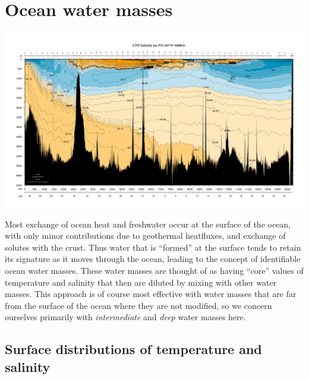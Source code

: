 
\chapter{Ocean water masses}
\label{ch:watermasses}


\includegraphics[width=6.5in]{figs/WaterMasses/P15_CTDSAL_all_1000.pdf}


Most exchange of ocean heat and freshwater occur at the surface of the ocean, with only minor contributions due to geothermal heatfluxes, and exchange of solutes with the crust.   Thus water that is ``formed'' at the surface tends to retain its signature as it moves through the ocean, leading to the concept of identifiable ocean water masses.  These water masses are thought of as having ``core'' values of temperature and salinity that then are diluted by mixing with other water masses.  This approach is of course most effective with water masses that are far from the surface of the ocean where they are not modified, so we concern ourselves primarily with \emph{intermediate} and \emph{deep} water masses here.  

\section{Surface distributions of temperature and salinity}


